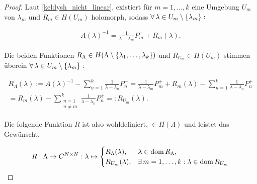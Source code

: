 \begin{proof}

    Laut \ref{keldysh_nicht_linear}, existiert für $m = 1, \dots, k$ eine Umgebung $U_m$ von $\lambda_m$ und $R_m \in H(U_m)$ holomorph, sodass $\forall \, \lambda \in U_m \setminus {\left \{ \lambda_m \right \}}:$

    \begin{align*}
        A(\lambda)^{-1}
        =
        \frac{1}{\lambda - \lambda_m} P_m^+
        +
        R_m(\lambda).
    \end{align*}

    Die beiden Funktionen $R_\Lambda \in H(\Lambda \setminus {\left \{ \lambda_1, \dots, \lambda_k \right \}})$ und $R_{U_m} \in H(U_m)$ stimmen überein $\forall \, \lambda \in U_m \setminus {\left \{ \lambda_m \right \}}:$

    \begin{multline*}
        R_\Lambda(\lambda)
        :=
        A(\lambda)^{-1}
        -
        \sum_{n=1}^k
            \frac{1}{\lambda - \lambda_n} P_n^+
        =
        \frac{1}{\lambda - \lambda_m} P_m^+
        +
        R_m(\lambda)
        -
        \sum_{n=1}^k
            \frac{1}{\lambda - \lambda_n} P_n^+ \\
        =
        R_m(\lambda)
        -
        \sum_{\substack{n = 1 \\ n \neq m}}^k
            \frac{1}{\lambda - \lambda_n} P_n^+
        =:
        R_{U_m}(\lambda).
    \end{multline*}

    Die folgende Funktion $R$ ist also wohldefiniert, $\in H(\Lambda)$ und leistet das Gewünscht.

    \begin{align*}
        R:
        \Lambda \to C^{N \times N}:
        \lambda
        \mapsto
        \begin{cases}
            R_\Lambda(\lambda), & \lambda \in \operatorname{dom} R_\Lambda, \\
            R_{U_m}(\lambda),   & \exists \, m = 1, \dots, k: \lambda \in \operatorname{dom} R_{U_m}
        \end{cases}
    \end{align*}

\end{proof}
